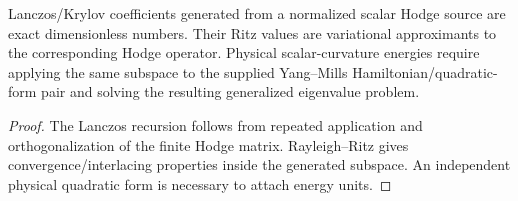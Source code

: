 \documentclass[12pt,a4paper]{article}
\begin{document}
\begin{theorem}
\label{p11:thm:native-scalar-curvature-krylov-block}

Lanczos/Krylov coefficients generated from a normalized scalar Hodge source are exact dimensionless numbers.  Their Ritz values are variational approximants to the corresponding Hodge operator.  Physical scalar-curvature energies require applying the same subspace to the supplied Yang--Mills Hamiltonian/quadratic-form pair and solving the resulting generalized eigenvalue problem.
\label{p11:eq:scalar-hodge-central-moments-extended}
\label{p11:eq:scalar-krylov-first-vector}
\label{p11:eq:scalar-krylov-first-coupling}
\label{p11:eq:scalar-krylov-second-residual}
\label{p11:eq:scalar-curvature-three-state-krylov-block}
\label{p11:eq:scalar-curvature-three-state-ritz-values}
\label{p11:eq:scalar-curvature-three-state-ritz-energies}
\end{theorem}
\begin{proof}

The Lanczos recursion follows from repeated application and orthogonalization of the finite Hodge matrix.  Rayleigh--Ritz gives convergence/interlacing properties inside the generated subspace.  An independent physical quadratic form is necessary to attach energy units.
\end{proof}
\end{document}
